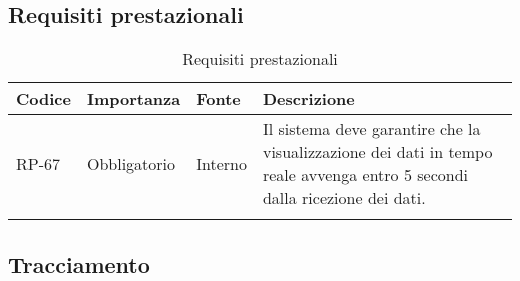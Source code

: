 \subsection{Requisiti prestazionali}
\begin{longtable}{|>{\centering\arraybackslash}m{}|>{\centering\arraybackslash}m{}|>{\centering\arraybackslash}m{}|>{\centering\arraybackslash}m{}|}
	\hline
	\textbf{Codice} & \textbf{Importanza} & \textbf{Fonte} & \textbf{Descrizione}
	\\\hline
	\endhead
	RP-67           & Obbligatorio        & Interno        & Il sistema deve garantire che la visualizzazione dei dati in tempo reale avvenga entro 5 secondi dalla ricezione dei dati.
	\\\hline
	\caption{Requisiti prestazionali}
\end{longtable}

\newpage

\subsection{Tracciamento}
